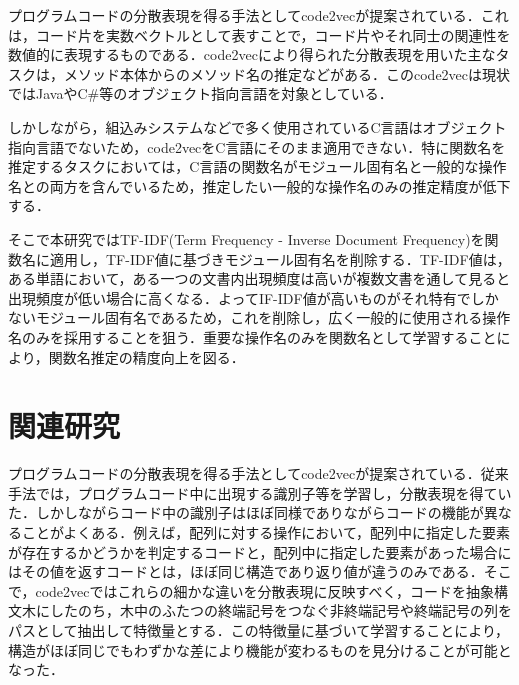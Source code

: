 \documentclass[submit,techrep,noauthor]{ipsj}
\begin{document}
プログラムコードの分散表現を得る手法としてcode2vec\cite{alon2019code2vec}が提案されている．これは，コード片を実数ベクトルとして表すことで，コード片やそれ同士の関連性を数値的に表現するものである．code2vecにより得られた分散表現を用いた主なタスクは，メソッド本体からのメソッド名の推定などがある．このcode2vecは現状ではJavaやC\#等のオブジェクト指向言語を対象としている．

しかしながら，組込みシステムなどで多く使用されているC言語はオブジェクト指向言語でないため，code2vecをC言語にそのまま適用できない．特に関数名を推定するタスクにおいては，C言語の関数名がモジュール固有名と一般的な操作名との両方を含んでいるため，推定したい一般的な操作名のみの推定精度が低下する．

そこで本研究ではTF-IDF(Term Frequency - Inverse Document Frequency)\cite{ramos2003using}を関数名に適用し，TF-IDF値に基づきモジュール固有名を削除する．TF-IDF値は，ある単語において，ある一つの文書内出現頻度は高いが複数文書を通して見ると出現頻度が低い場合に高くなる．よってIF-IDF値が高いものがそれ特有でしかないモジュール固有名であるため，これを削除し，広く一般的に使用される操作名のみを採用することを狙う．重要な操作名のみを関数名として学習することにより，関数名推定の精度向上を図る．




\section{関連研究}

プログラムコードの分散表現を得る手法としてcode2vec\cite{alon2019code2vec}が提案されている．従来手法では，プログラムコード中に出現する識別子等を学習し，分散表現を得ていた．しかしながらコード中の識別子はほぼ同様でありながらコードの機能が異なることがよくある．例えば，配列に対する操作において，配列中に指定した要素が存在するかどうかを判定するコードと，配列中に指定した要素があった場合にはその値を返すコードとは，ほぼ同じ構造であり返り値が違うのみである．そこで，code2vecではこれらの細かな違いを分散表現に反映すべく，コードを抽象構文木にしたのち，木中のふたつの終端記号をつなぐ非終端記号や終端記号の列をパスとして抽出して特徴量とする．この特徴量に基づいて学習することにより，構造がほぼ同じでもわずかな差により機能が変わるものを見分けることが可能となった．
\end{document}
